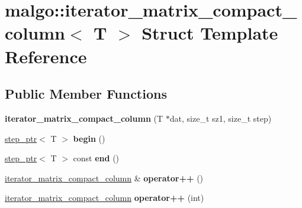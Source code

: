 \hypertarget{structmalgo_1_1iterator__matrix__compact__column}{}\section{malgo\+:\+:iterator\+\_\+matrix\+\_\+compact\+\_\+column$<$ T $>$ Struct Template Reference}
\label{structmalgo_1_1iterator__matrix__compact__column}
\subsection*{Public Member Functions}
\begin{DoxyCompactItemize}
\item 
{\bfseries iterator\+\_\+matrix\+\_\+compact\+\_\+column} (T $\ast$dat, size\+\_\+t sz1, size\+\_\+t step)\hypertarget{structmalgo_1_1iterator__matrix__compact__column_a7ee2532a3b4d0f6e1c13e9b67f9b9124}{}\label{structmalgo_1_1iterator__matrix__compact__column_a7ee2532a3b4d0f6e1c13e9b67f9b9124}

\item 
\hyperlink{structmalgo_1_1step__ptr}{step\+\_\+ptr}$<$ T $>$ {\bfseries begin} ()\hypertarget{structmalgo_1_1iterator__matrix__compact__column_a6cfc4841864467db089b43e009104268}{}\label{structmalgo_1_1iterator__matrix__compact__column_a6cfc4841864467db089b43e009104268}

\item 
\hyperlink{structmalgo_1_1step__ptr}{step\+\_\+ptr}$<$ T $>$ const {\bfseries end} ()\hypertarget{structmalgo_1_1iterator__matrix__compact__column_af0e7e74c910ad4020fdc6a1d4b39202e}{}\label{structmalgo_1_1iterator__matrix__compact__column_af0e7e74c910ad4020fdc6a1d4b39202e}

\item 
\hyperlink{structmalgo_1_1iterator__matrix__compact__column}{iterator\+\_\+matrix\+\_\+compact\+\_\+column} \& {\bfseries operator++} ()\hypertarget{structmalgo_1_1iterator__matrix__compact__column_a0b923f5739f3a808984389c6285329b9}{}\label{structmalgo_1_1iterator__matrix__compact__column_a0b923f5739f3a808984389c6285329b9}

\item 
\hyperlink{structmalgo_1_1iterator__matrix__compact__column}{iterator\+\_\+matrix\+\_\+compact\+\_\+column} {\bfseries operator++} (int)\hypertarget{structmalgo_1_1iterator__matrix__compact__column_a428c0229a6182ff1219cd20baf6109b2}{}\label{structmalgo_1_1iterator__matrix__compact__column_a428c0229a6182ff1219cd20baf6109b2}


\end{DoxyCompactItemize}
